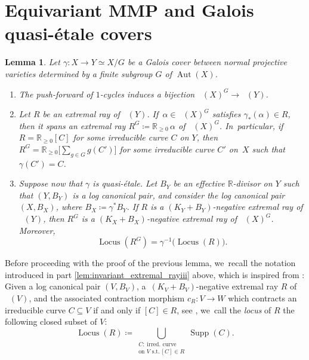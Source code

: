 \documentclass[10pt]{amsart}
\theoremstyle{plain}
\newtheorem{lem}[thm]{Lemma}
\theoremstyle{definition}
\newcommand{\R}{\mathbb{R}}
\DeclareMathOperator{\Supp}{Supp}
\DeclareMathOperator{\Aut}{Aut}
\DeclareMathOperator{\Locus}{Locus}
\DeclareMathOperator{\NEb}{\overline{\mathrm{NE}}}
\begin{document}
\section{Equivariant MMP and Galois quasi-étale covers}
\label{section:MMP}

\begin{lem}
\label{lem:invariant_extremal_ray}
Let $\gamma \colon X\to Y \simeq X/G$ be a Galois cover between normal projective varieties determined by a finite subgroup $G$ of $\Aut(X)$.
\begin{enumerate}
\item\label{lem:invariant_extremal_rayi}
The push-forward of $1$\nobreakdash-cycles induces a bijection $\NEb(X)^G \to \NEb(Y)$.

\item\label{lem:invariant_extremal_rayii}
Let $R$ be an extremal ray of $\NEb(Y)$. If~$\alpha \in \NEb(X)^G$ satisfies $\gamma_*(\alpha) \in R$, then it spans an extremal ray $R^G \coloneqq \R_{\geq 0} \,\alpha$ of $\NEb(X)^G$. In~particular, if $R = \R_{\geq 0} [C]$ for some irreducible curve $C$ on $Y$, then $R^G = \R_{\geq 0} \big[ \sum_{g\in G} g(C') \big]$ for some irreducible curve $C'$ on~$X$ such that $\gamma(C') = C$.

\item\label{lem:invariant_extremal_rayiii}
Suppose now that $\gamma$ is quasi-étale. Let $B_Y$ be an effective $\R$\nobreakdash-divisor on $Y$ such that $(Y, B_Y)$ is a log canonical pair, and consider the log canonical pair $(X,B_X)$, where $B_X \coloneqq \gamma^* B_Y$.
If $R$ is a $(K_Y+B_Y)$-negative extremal ray of $\NEb(Y)$, then $R^G$ is a $(K_X+B_X)$-negative extremal ray of $\NEb(X)^G$.
Moreover,
\[
\Locus \left(R^G \right) = \gamma^{-1} \bigl(\Locus(R) \bigr).
\]
\end{enumerate}
\end{lem}

Before proceeding with the proof of the previous lemma, we~recall the notation introduced in part \eqref{lem:invariant_extremal_rayiii} above, which is inspired from \cite[\S 6.5, p.\ 154]{Debarre01book}: Given a log canonical pair $(V,B_V)$, a~$(K_V+B_V)$-negative extremal ray $R$ of $\NEb(V)$, and the associated contraction morphism $c_R \colon V \to W$ which contracts an irreducible curve $C \subseteq V$ if and only if $[C] \in R$, see \cite[Th.\,4.5.2]{Fuj17book}, we~call the \emph{locus} of $R$ the following closed subset of $V$:
\[
\Locus(R) \coloneqq \bigcup_{\substack{C: \; \textrm{irred. curve} \\[0.1em] \textrm{on $V$ s.t.} \,[C] \in R}} \Supp(C).
\]
\end{document}
